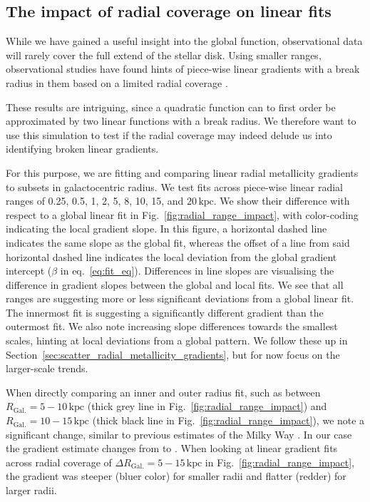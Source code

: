 \documentclass[fleqn,usenatbib]{mnras}
\begin{document}
\subsection{The impact of radial coverage on linear fits}

While we have gained a useful insight into the global function, observational data will rarely cover the full extend of the stellar disk. Using smaller ranges, observational studies have found hints of piece-wise linear gradients with a break radius in them based on a limited radial coverage \citep[e.g.][]{Yong2012, Donor2020, Chen2023}.

These results are intriguing, since a quadratic function can to first order be approximated by two linear functions with a break radius. We therefore want to use this simulation to test if the radial coverage may indeed delude us into identifying broken linear gradients.

For this purpose, we are fitting and comparing linear radial metallicity gradients to subsets in galactocentric radius. We test fits across piece-wise linear radial ranges of 0.25, 0.5, 1, 2, 5, 8, 10, 15, and $20\,\mathrm{kpc}$. We show their difference with respect to a global linear fit in Fig.~\ref{fig:radial_range_impact}, with color-coding indicating the local gradient slope. In this figure, a horizontal dashed line indicates the same slope as the global fit, whereas the offset of a line from said horizontal dashed line indicates the local deviation from the global gradient intercept ($\beta$ in eq.~\ref{eq:fit_eq}). Differences in line slopes are visualising the difference in gradient slopes between the global and local fits. We see that all ranges are suggesting more or less significant deviations from a global linear fit. The innermost fit is suggesting a significantly different gradient than the outermost fit. We also note increasing slope differences towards the smallest scales, hinting at local deviations from a global pattern. We follow these up in Section~\ref{sec:scatter_radial_metallicity_gradients}, but for now focus on the larger-scale trends.

When directly comparing an inner and outer radius fit, such as between $R_\mathrm{Gal.} = 5-10\,\mathrm{kpc}$ (thick grey line in Fig.~\ref{fig:radial_range_impact}) and $R_\mathrm{Gal.} = 10-15\,\mathrm{kpc}$ (thick black line in Fig.~\ref{fig:radial_range_impact}), we note a significant change, similar to previous estimates of the Milky Way \citep[e.g.][]{Yong2012, Lemasle2008}. In our case the gradient estimate changes from  to . When looking at linear gradient fits across radial coverage of $\Delta R_\mathrm{Gal.} = 5-15\,\mathrm{kpc}$ in Fig.~\ref{fig:radial_range_impact}, the gradient was steeper (bluer color) for smaller radii and flatter (redder) for larger radii.
\end{document}
